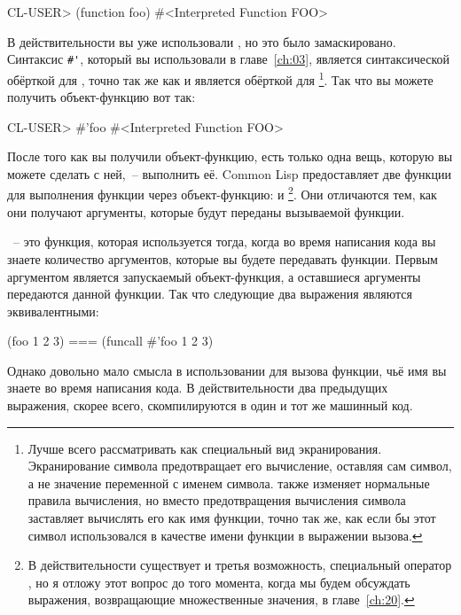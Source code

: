\begin{myverb}
  CL-USER> (function foo)
  #<Interpreted Function FOO>
\end{myverb}

В действительности вы уже использовали , но это было
замаскировано. Синтаксис \lstinline!#'!, который вы использовали в
главе~\ref{ch:03}, является синтаксической обёрткой для , точно
так же как и  является обёрткой для \footnote{Лучше всего
  рассматривать  как специальный вид экранирования.
  Экранирование символа предотвращает его вычисление, оставляя сам символ, а не
  значение переменной с именем символа.  также изменяет
  нормальные правила вычисления, но вместо предотвращения вычисления символа
  заставляет вычислять его как имя функции, точно так же, как если бы этот символ
  использовался в качестве имени функции в выражении вызова.}.  Так что вы можете
  получить объект-функцию вот так:

\begin{myverb}
  CL-USER> #'foo
  #<Interpreted Function FOO>
\end{myverb}

После того как вы получили объект-функцию, есть только одна вещь, которую вы можете
сделать с ней,~-- выполнить её. Common Lisp предоставляет две функции для выполнения
функции через объект-функцию:  и \footnote{В действительности
  существует и третья возможность, специальный оператор , но я
  отложу этот вопрос до того момента, когда мы будем обсуждать выражения, возвращающие
  множественные значения, в главе~\ref{ch:20}.}. Они отличаются тем, как они получают
  аргументы, которые будут переданы вызываемой функции.

~-- это функция, которая используется тогда, когда во время написания кода вы
знаете количество аргументов, которые вы будете передавать функции.  Первым аргументом
 является запускаемый объект-функция, а оставшиеся аргументы передаются
данной функции.  Так что следующие два выражения являются эквивалентными:

\begin{myverb}
  (foo 1 2 3) === (funcall #'foo 1 2 3)
\end{myverb}

Однако довольно мало смысла в использовании  для вызова функции, чьё имя вы
знаете во время написания кода.  В действительности два предыдущих выражения, скорее всего,
скомпилируются в один и тот же машинный код.

